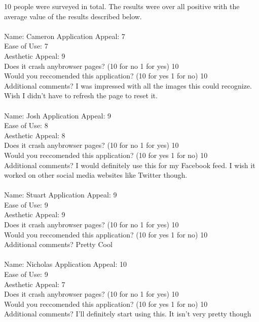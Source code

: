 \documentclass[12pt, titlepage]{article}
\begin{document}
10 people were surveyed in total. The results were over all positive with the average value of the results described below.	\\
\\
Name: Cameron
Application Appeal: 7 \\ 
Ease of Use: 7\\ 
Aesthetic Appeal: 9\\ 
Does it crash anybrowser pages? (10 for no 1 for yes) 10\\ 
Would you reccomended this application? (10 for yes 1 for no) 10\\ 
Additional comments? I was impressed with all the images this could recognize. Wish I didn't have to refresh the page to reset it.\\

\\
Name: Josh
Application Appeal: 9 \\ 
Ease of Use: 8\\ 
Aesthetic Appeal: 8\\ 
Does it crash anybrowser pages? (10 for no 1 for yes) 10\\ 
Would you reccomended this application? (10 for yes 1 for no) 10\\ 
Additional comments? I would definitely use this for my Facebook feed. I wish it worked on other social media websites like Twitter though.\\

\\
Name: Stuart
Application Appeal: 9 \\ 
Ease of Use: 9\\ 
Aesthetic Appeal: 9\\ 
Does it crash anybrowser pages? (10 for no 1 for yes) 10\\ 
Would you reccomended this application? (10 for yes 1 for no) 10\\ 
Additional comments? Pretty Cool\\

\\
Name: Nicholas
Application Appeal: 10 \\ 
Ease of Use: 9\\ 
Aesthetic Appeal: 7\\ 
Does it crash anybrowser pages? (10 for no 1 for yes) 10\\ 
Would you reccomended this application? (10 for yes 1 for no) 10\\ 
Additional comments? I'll definitely start using this. It isn't very pretty though\\
\end{document}
